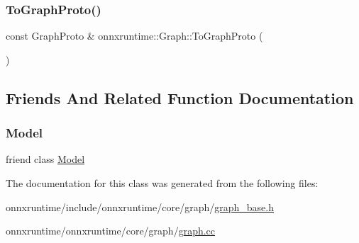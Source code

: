 \mbox{\label{classonnxruntime_1_1Graph_a9fdaa2f3924b5b06a2a6cda0821d9d6a}} 
\subsubsection{\texorpdfstring{To\+Graph\+Proto()}{ToGraphProto()}}
{\footnotesize\ttfamily const Graph\+Proto \& onnxruntime\+::\+Graph\+::\+To\+Graph\+Proto (\begin{DoxyParamCaption}{ }\end{DoxyParamCaption})}



\subsection{Friends And Related Function Documentation}
\mbox{\label{classonnxruntime_1_1Graph_a2bf2a0e9b454c55aa5dcb5aa4698697b}} 
\subsubsection{\texorpdfstring{Model}{Model}}
{\footnotesize\ttfamily friend class \mbox{\hyperlink{classonnxruntime_1_1Model}{Model}}\hspace{0.3cm}{\ttfamily [friend]}}



The documentation for this class was generated from the following files\+:\begin{DoxyCompactItemize}
\item 
onnxruntime/include/onnxruntime/core/graph/\mbox{\hyperlink{graph__base_8h}{graph\+\_\+base.\+h}}\item 
onnxruntime/onnxruntime/core/graph/\mbox{\hyperlink{graph_8cc}{graph.\+cc}}\end{DoxyCompactItemize}
